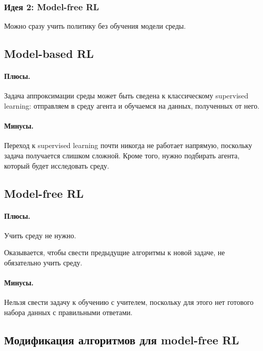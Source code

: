 \documentclass[12pt,a4paper]{article}
\begin{document}
\subsubsection{Идея 2: Model-free RL}

Можно сразу учить политику без обучения модели среды.

\subsection{Model-based RL}

\paragraph{Плюсы.}

Задача аппроксимации среды может быть сведена к классическому supervised learning: отправляем в среду агента и обучаемся на данных, полученных от него.

\paragraph{Минусы.}

Переход к supervised learning почти никогда не работает напрямую, поскольку задача получается слишком сложной. Кроме того, нужно подбирать агента, который будет исследовать среду.

\subsection{Model-free RL}

\paragraph{Плюсы.}

Учить среду не нужно.

Оказывается, чтобы свести предыдущие алгоритмы к новой задаче, не обязательно учить среду.

\paragraph{Минусы.}

Нельзя свести задачу к обучению с учителем, поскольку для этого нет готового набора данных с правильными ответами.

\subsection{Модификация алгоритмов для model-free RL}
\end{document}
